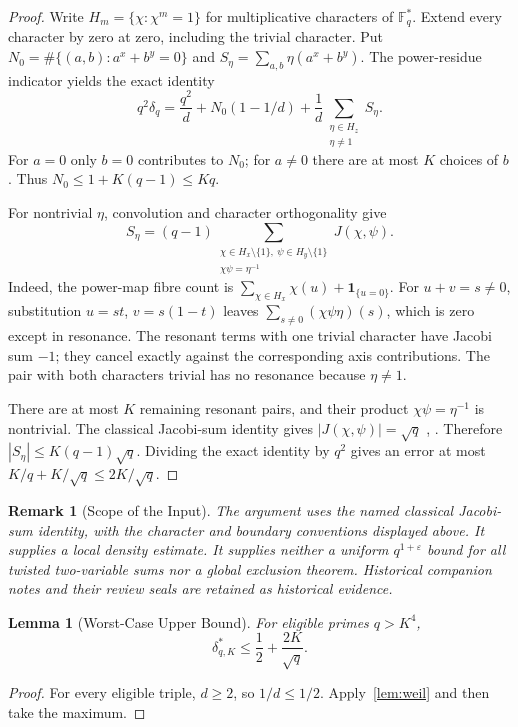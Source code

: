 \documentclass[11pt,a4paper]{article}
\newtheorem{lemma}[theorem]{Lemma}
\newtheorem{remark}[theorem]{Remark}
\begin{document}
\begin{proof}
Write $H_m=\{\chi:\chi^m=1\}$ for multiplicative characters of
$\mathbb F_q^*$. Extend every character by zero at zero, including
the trivial character. Put $N_0=\#\{(a,b):a^x+b^y=0\}$ and
$S_\eta=\sum_{a,b}\eta(a^x+b^y)$. The power-residue indicator yields
the exact identity
\[
 q^2\delta_q=\frac{q^2}{d}
       +N_0(1-1/d)+\frac1d\sum_{\substack{\eta\in H_z\\\eta\ne1}}S_\eta.
\]
For $a=0$ only $b=0$ contributes to $N_0$; for $a\ne0$ there are
at most $K$ choices of $b$. Thus $N_0\le1+K(q-1)\le Kq$.

For nontrivial $\eta$, convolution and character orthogonality give
\[
 S_\eta=(q-1)
 \sum_{\substack{\chi\in H_x\setminus\{1\},\
                 \psi\in H_y\setminus\{1\}\\
                 \chi\psi=\eta^{-1}}}J(\chi,\psi).
\]
Indeed, the power-map fibre count is
$\sum_{\chi\in H_x}\chi(u)+\mathbf1_{\{u=0\}}$.
For $u+v=s\ne0$, substitution $u=st$, $v=s(1-t)$ leaves
$\sum_{s\ne0}(\chi\psi\eta)(s)$, which is zero except in resonance.
The resonant terms with one trivial character have Jacobi sum $-1$;
they cancel exactly against the corresponding axis contributions.
The pair with both characters trivial has no resonance because
$\eta\ne1$.

There are at most $K$ remaining resonant pairs, and their product
$\chi\psi=\eta^{-1}$ is nontrivial. The classical Jacobi-sum
identity gives $|J(\chi,\psi)|=\sqrt q$
\cite{Weil1948}, \cite[Ch.~8]{IrelandRosen}. Therefore
$|S_\eta|\le K(q-1)\sqrt q$. Dividing the exact identity by $q^2$
gives an error at most $K/q+K/\sqrt q\le2K/\sqrt q$.
\end{proof}

\begin{remark}[Scope of the Input]
The argument uses the named classical Jacobi-sum identity, with
the character and boundary conventions displayed above. It supplies
a local density estimate. It supplies neither a uniform
$q^{1+\varepsilon}$ bound for all twisted two-variable sums nor a
global exclusion theorem. Historical companion notes and their
review seals are retained as historical evidence.
\end{remark}

\begin{lemma}[Worst-Case Upper Bound]
\label{lem:worstcase}
For eligible primes $q>K^4$,
\[
 \delta_{q,K}^{*}\le\frac12+\frac{2K}{\sqrt q}.
\]
\end{lemma}
\begin{proof}
For every eligible triple, $d\ge2$, so $1/d\le1/2$.
Apply~\cref{lem:weil} and then take the maximum.
\end{proof}
\end{document}
